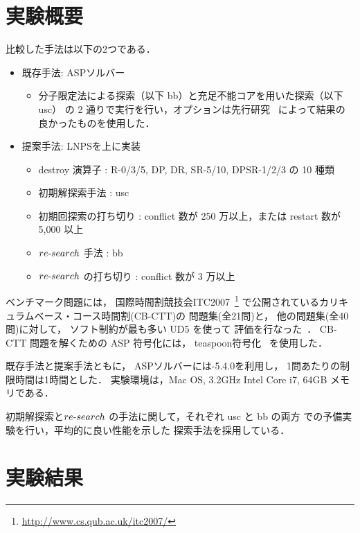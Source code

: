 \section{実験概要}
比較した手法は以下の2つである．
\begin{itemize}\compress
\item 既存手法: ASPソルバー{\clingo}
 \begin{itemize}
  \item 分子限定法による探索（以下 bb）と充足不能コアを用いた探索（以下 usc）
  の 2 通りで実行を行い，オプションは先行研究~\cite{anor/Banbara2019}
  によって結果の良かったものを使用した．
 \end{itemize}
\item 提案手法: LNPSを{\clingo}上に実装
 \begin{itemize}
  \item destroy 演算子 : R-0/3/5, DP, DR, SR-5/10, DPSR-1/2/3 の 10 種類
  \item 初期解探索手法 : usc
  \item 初期回探索の打ち切り : conflict 数が 250 万以上，または restart 数が 5,000 以上
  \item $re\mathchar`-search$ 手法 : bb
  \item $re\mathchar`-search$ の打ち切り : conflict 数が 3 万以上
  
 \end{itemize}
\end{itemize}

ベンチマーク問題には，
国際時間割競技会ITC2007~\footnote{%
  \url{http://www.cs.qub.ac.uk/itc2007/}}
で公開されているカリキュラムベース・コース時間割(CB-CTT)の
問題集(全21問)と，
他の問題集(全40問)に対して，
ソフト制約が最も多い UD5 を使って
評価を行なった~\cite{GasperoMS/ITC2007,DBLP:journals/anor/BonuttiCGS12}．
CB-CTT 問題を解くための ASP 符号化には，
\textsf{teaspoon}符号化~\cite{anor/Banbara2019}
を使用した．
%

既存手法と提案手法ともに，
ASPソルバーには{\clingo}-5.4.0を利用し，
1問あたりの制限時間は1時間とした．
実験環境は，Mac OS, 3.2GHz Intel Core i7, 64GB メモリである．

初期解探索と$re\mathchar`-search$
の手法に関して，それぞれ usc と bb の両方
での予備実験を行い，平均的に良い性能を示した
探索手法を採用している．

\section{実験結果}

